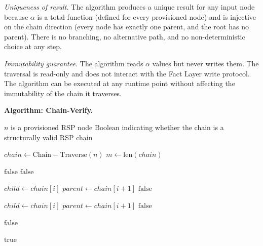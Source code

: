 \textit{Uniqueness of result.} The algorithm produces a unique result for any input node because $\alpha$ is a total function (defined for every provisioned node) and is injective on the chain direction (every node has exactly one parent, and the root has no parent). There is no branching, no alternative path, and no non-deterministic choice at any step.

\textit{Immutability guarantee.} The algorithm reads $\alpha$ values but never writes them. The traversal is read-only and does not interact with the Fact Layer write protocol. The algorithm can be executed at any runtime point without affecting the immutability of the chain it traverses.

\medskip
\noindent\textbf{Algorithm: Chain-Verify.}

\begin{algorithm}
\caption{Chain-Verify($n$) --- Verify the authorization chain from node $n$ to human anchor}
\label{alg:chain-verify}
\begin{algorithmic}[1]
\REQUIRE $n$ is a provisioned RSP node
\ENSURE $\mathrm{Boolean}$ indicating whether the chain is a structurally valid RSP chain

\STATE $chain \leftarrow \mathrm{Chain-Traverse}(n)$
\STATE $m \leftarrow \mathrm{len}(chain)$

\STATE {}
    \STATE \RETURN $\mathrm{false}$ 
\ENDIF
{}
    \STATE \RETURN $\mathrm{false}$ 
\ENDIF

\STATE {}
    \STATE $child \leftarrow chain[i]$
    \STATE $parent \leftarrow chain[i+1]$
        \STATE \RETURN $\mathrm{false}$ 
    \ENDIF
\ENDFOR

\STATE {}
    \STATE $child \leftarrow chain[i]$
    \STATE $parent \leftarrow chain[i+1]$
        \STATE \RETURN $\mathrm{false}$ 
    \ENDIF
\ENDFOR

\STATE {}
        \STATE \RETURN $\mathrm{false}$ 
    \ENDIF
\ENDFOR

\RETURN $\mathrm{true}$
\end{algorithmic}
\end{algorithm}

